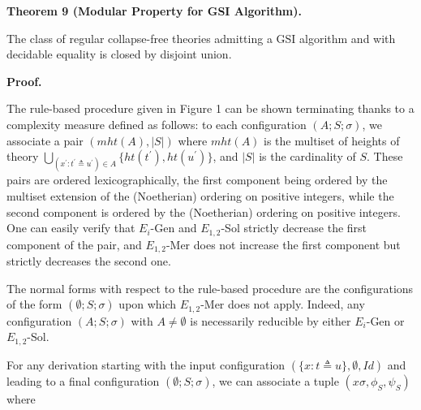 \documentclass[10pt,a4paper]{amsart}
\begin{document}
 
 
\par\medskip\noindent\textbf{Theorem 9 (Modular Property for GSI Algorithm).}\par
 
 
The class of regular collapse-free theories admitting a GSI algorithm and with decidable equality is closed by disjoint union.\par
 
 
 

 
\par\medskip\noindent\textbf{Proof.}\par
 
 
The rule-based procedure given in Figure 1 can be shown terminating thanks to a complexity measure defined as follows: to each configuration $(A;S;\sigma)$, we associate a pair $(mht(A),|S|)$ where $mht(A)$ is the multiset of heights of theory $\bigcup_{(x^{\prime}:t^{\prime}\triangleq u^{\prime})\in A}\{ht(t^{\prime}),ht(u^{\prime})\}$, and $|S|$ is the cardinality of $S$. These pairs are ordered lexicographically, the first component being ordered by the multiset extension of the (Noetherian) ordering on positive integers, while the second component is ordered by the (Noetherian) ordering on positive integers. One can easily verify that $E_{i}$-Gen and $E_{1,2}$-Sol strictly decrease the first component of the pair, and $E_{1,2}$-Mer does not increase the first component but strictly decreases the second one.\par
 
 
 
The normal forms with respect to the rule-based procedure are the configurations of the form $(\emptyset;S;\sigma)$ upon which $E_{1,2}$-Mer does not apply. Indeed, any configuration $(A;S;\sigma)$ with $A\neq\emptyset$ is necessarily reducible by either $E_{i}$-Gen or $E_{1,2}$-Sol.\par
 
 
 
For any derivation starting with the input configuration $(\{x:t\triangleq u\},\emptyset,\mathit{Id})$ and leading to a final configuration $(\emptyset;S;\sigma)$, we can associate a tuple $(x\sigma,\phi_{S},\psi_{S})$ where\par
  
\end{document}
